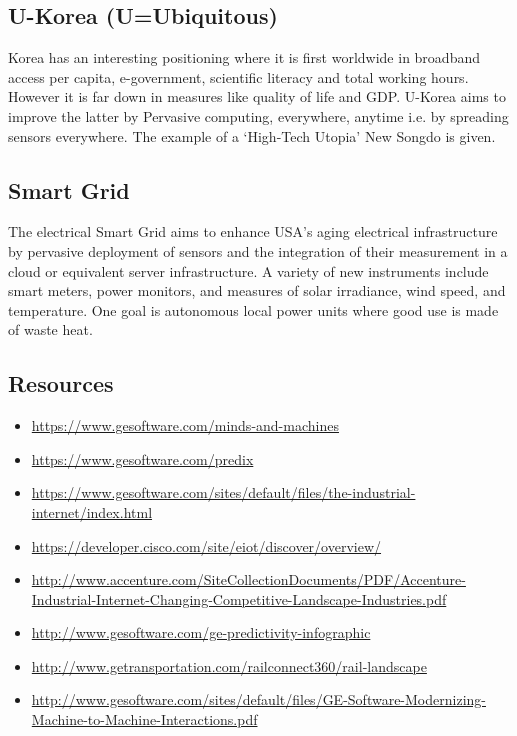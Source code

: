 \subsection{U-Korea (U=Ubiquitous)}\label{u-korea-uubiquitous}

Korea has an interesting positioning where it is first worldwide in
broadband access per capita, e-government, scientific literacy and total
working hours. However it is far down in measures like quality of life
and GDP. U-Korea aims to improve the latter by Pervasive computing,
everywhere, anytime i.e. by spreading sensors everywhere. The example of
a `High-Tech Utopia' New Songdo is given.



\subsection{Smart Grid}\label{smart-grid}

The electrical Smart Grid aims to enhance USA's aging electrical
infrastructure by pervasive deployment of sensors and the integration of
their measurement in a cloud or equivalent server infrastructure. A
variety of new instruments include smart meters, power monitors, and
measures of solar irradiance, wind speed, and temperature. One goal is
autonomous local power units where good use is made of waste heat.




\subsection{Resources}\label{resources}

\begin{itemize}
\item
  \url{https://www.gesoftware.com/minds-and-machines}
\item
  \url{https://www.gesoftware.com/predix}
\item
  \url{https://www.gesoftware.com/sites/default/files/the-industrial-internet/index.html}
\item
  \url{https://developer.cisco.com/site/eiot/discover/overview/}
\item
  \url{http://www.accenture.com/SiteCollectionDocuments/PDF/Accenture-Industrial-Internet-Changing-Competitive-Landscape-Industries.pdf}
\item
  \url{http://www.gesoftware.com/ge-predictivity-infographic}
\item
  \url{http://www.getransportation.com/railconnect360/rail-landscape}
\item
  \url{http://www.gesoftware.com/sites/default/files/GE-Software-Modernizing-Machine-to-Machine-Interactions.pdf}
\end{itemize}
